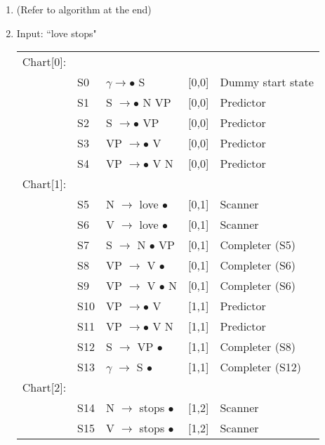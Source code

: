 \documentclass[fleqn,11pt]{article}
\begin{document}
\maketitle
\begin{enumerate}
\item (Refer to algorithm at the end)

\item Input: ``love stops" \\
\begin{tabular}{l l l l l}
Chart[0]: & \\
\checkmark		&		S0		&		$\gamma \rightarrow \bullet$ S		&		[0,0]		&		Dummy start state \\
\checkmark		&		S1		&		S $\rightarrow \bullet$ N VP		&		[0,0]		&		Predictor \\
\checkmark		&		S2		&		S $\rightarrow \bullet$ VP			&		[0,0]		&		Predictor \\
\checkmark		&		S3		&		VP $\rightarrow \bullet$ V			&		[0,0]		&		Predictor \\
\checkmark		&		S4		&		VP $\rightarrow \bullet$ V N		&		[0,0]		&		Predictor \\
Chart[1]: & \\
\checkmark		&		S5		&		N $\rightarrow$ love $\bullet$		&		[0,1]		&		Scanner \\
\checkmark		&		S6		&		V $\rightarrow$ love $\bullet$		&		[0,1]		&		Scanner \\
\checkmark		&		S7		&		S $\rightarrow$ N $\bullet$ VP		&		[0,1]		&		Completer (S5) \\
\checkmark		&		S8		&		VP $\rightarrow$ V $\bullet$		&		[0,1]		&		Completer (S6) \\
\checkmark		&		S9		&		VP $\rightarrow$ V $\bullet$ N		&		[0,1]		&		Completer (S6) \\
\checkmark		&		S10		&		VP $\rightarrow \bullet$ V			&		[1,1]		&		Predictor \\
\checkmark		&		S11		&		VP $\rightarrow \bullet$ V N		&		[1,1]		&		Predictor \\
\checkmark		&		S12		&		S $\rightarrow$ VP $\bullet$		&		[1,1]		&		Completer (S8) \\
\checkmark		&		S13		&		$\gamma$ $\rightarrow$ S $\bullet$&		[1,1]		&		Completer (S12) \\
Chart[2]: & \\
\checkmark		&		S14		&		N $\rightarrow$ stops $\bullet$	&		[1,2]		&		Scanner \\
\checkmark		&		S15		&		V $\rightarrow$ stops $\bullet$	&		[1,2]		&		Scanner \\

\end{tabular}
\end{enumerate}
\end{document}
